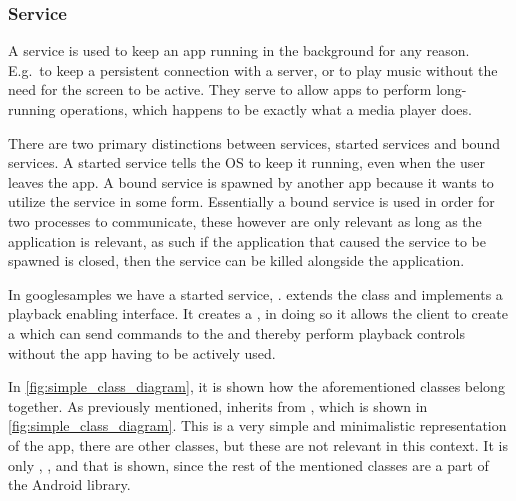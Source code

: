 \subsubsection{Service}\label{subsec:services}
A service is used to keep an app running in the background for any reason.
E.g.~to keep a persistent connection with a server, or to play music without the need for the screen to be active.
They serve to allow apps to perform long-running operations, which happens to be exactly what a media player does.

There are two primary distinctions between services, started services and bound services.
A started service tells the OS to keep it running, even when the user leaves the app.
A bound service is spawned by another app because it wants to utilize the service in some form.
Essentially a bound service is used in order for two processes to communicate, these however are only relevant as long as the application is relevant, as such if the application that caused the service to be spawned is closed, then the service can be killed alongside the application.\cite{androidFundamentals}

In googlesamples we have a started service, .
\sloppy{} extends the  class and implements a playback enabling interface.
It creates a , in doing so it allows the client to create a  which can send commands to the  and thereby perform playback controls without the app having to be actively used.

In \cref{fig:simple_class_diagram}, it is shown how the aforementioned classes belong together.
As previously mentioned,  inherits from , which is shown in \cref{fig:simple_class_diagram}.
This is a very simple and minimalistic representation of the app, there are other classes, but these are not relevant in this context.
It is only , , and  that is shown, since the rest of the mentioned classes are a part of the Android library.


